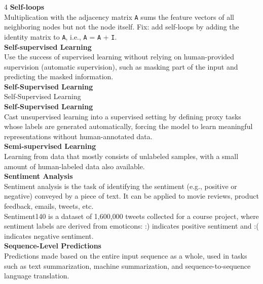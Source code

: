 \documentclass[8pt]{extarticle}
\begin{document}
\begin{multicols}{4}
\vspace{2pt}\textbf{Self-loops}\\
Multiplication with the adjacency matrix \texttt{A} sums the feature vectors of all neighboring nodes but not the node itself. Fix: add self-loops by adding the identity matrix to \texttt{A}, i.e., \texttt{A} = \texttt{A} + \texttt{I}.\\
\vspace{2pt}\textbf{Self-supervised Learning}\\
Use the success of supervised learning without relying on human-provided supervision (automatic supervision), such as masking part of the input and predicting the masked information.\\
\vspace{2pt}\textbf{Self-Supervised Learning}\\
Self-Supervised Learning\\
\vspace{2pt}\textbf{Self‑Supervised Learning}\\
Cast unsupervised learning into a supervised setting by defining proxy tasks whose labels are generated automatically, forcing the model to learn meaningful representations without human-annotated data.\\
\vspace{2pt}\textbf{Semi-supervised Learning}\\
Learning from data that mostly consists of unlabeled samples, with a small amount of human-labeled data also available.\\
\vspace{2pt}\textbf{Sentiment Analysis}\\
Sentiment analysis is the task of identifying the sentiment (e.g., positive or negative) conveyed by a piece of text. It can be applied to movie reviews, product feedback, emails, tweets, etc.\\
Sentiment140 is a dataset of 1,600,000 tweets collected for a course project, where sentiment labels are derived from emoticons: :) indicates positive sentiment and :( indicates negative sentiment.\\
\vspace{2pt}\textbf{Sequence-Level Predictions}\\
Predictions made based on the entire input sequence as a whole, used in tasks such as text summarization, machine summarization, and sequence-to-sequence language translation.\\


\end{multicols}
\end{document}
